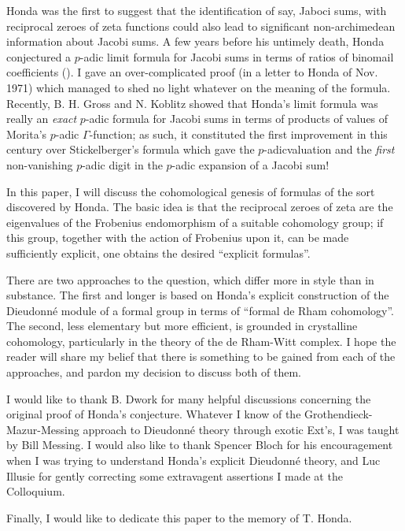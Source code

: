 Honda was the first to suggest that the identification of say, Jaboci sums, with reciprocal zeroes of zeta functions could also lead to significant non-archimedean information about Jacobi sums. A few years before his untimely death, Honda conjectured a $p$-adic limit formula for Jacobi sums in terms of ratios of binomail coefficients (\cite{art6-key23}). I gave an over-complicated proof (in a letter to Honda of Nov. 1971) which managed to shed no light whatever on the meaning of the formula. Recently, B. H. Gross and N. Koblitz \cite{art6-key14} showed that Honda's limit formula was really an {\em exact} $p$-adic formula for Jacobi sums in terms of products of values of Morita's $p$-adic $\Gamma$-function; as such, it constituted the first improvement in this century over Stickelberger's formula which gave the $p$-adic\pageoriginale valuation and the {\em first} non-vanishing $p$-adic digit in the $p$-adic expansion of a Jacobi sum!

In this paper, I will discuss the cohomological genesis of formulas of the sort discovered by Honda. The basic idea is that the reciprocal zeroes of zeta are the eigenvalues of the Frobenius endomorphism of a suitable cohomology group; if this group, together with the action of Frobenius upon it, can be made sufficiently explicit, one obtains the desired ``explicit formulas''.

There are two approaches to the question, which differ more in style than in substance. The first and longer is based on Honda's explicit construction of the Dieudonn\'e module of a formal group in terms of ``formal de Rham cohomology''. The second, less elementary but more efficient, is grounded in crystalline cohomology, particularly in the theory of the de Rham-Witt complex. I hope the reader will share my belief that there is something to be gained from each of the approaches, and pardon my decision to discuss both of them.

I would like to thank B. Dwork for many helpful discussions concerning the original proof of Honda's conjecture. Whatever I know of the Grothendieck-Mazur-Messing approach to Dieudonn\'e theory through exotic Ext's, I was taught by Bill Messing. I would also like to thank Spencer Bloch for his encouragement when I was trying to understand Honda's explicit Dieudonn\'e theory, and Luc Illusie for gently correcting some extravagent assertions I made at the Colloquium.

Finally, I would like to dedicate this paper to the memory of T. Honda.

